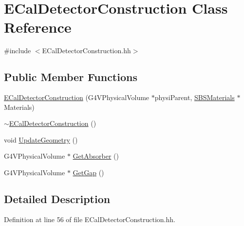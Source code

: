 \hypertarget{class_e_cal_detector_construction}{\section{E\-Cal\-Detector\-Construction Class Reference}
\label{class_e_cal_detector_construction}
}


{\ttfamily \#include $<$E\-Cal\-Detector\-Construction.\-hh$>$}

\subsection*{Public Member Functions}
\begin{DoxyCompactItemize}
\item 
\hyperlink{class_e_cal_detector_construction_ad7b4dc31e1138aa6f3ee99b7b5bc60af}{E\-Cal\-Detector\-Construction} (G4\-V\-Physical\-Volume $\ast$physi\-Parent, \hyperlink{class_s_b_s_materials}{S\-B\-S\-Materials} $\ast$Materials)
\item 
\hyperlink{class_e_cal_detector_construction_a28e034fc3c3961369812c3e363719072}{$\sim$\-E\-Cal\-Detector\-Construction} ()
\item 
void \hyperlink{class_e_cal_detector_construction_aa1f9eb7928fee8e2dd62d488b60fc6f7}{Update\-Geometry} ()
\item 
G4\-V\-Physical\-Volume $\ast$ \hyperlink{class_e_cal_detector_construction_ac50bfcd7b4b64dc1a72cad91b131efb9}{Get\-Absorber} ()
\item 
G4\-V\-Physical\-Volume $\ast$ \hyperlink{class_e_cal_detector_construction_a97440bb92db785649209d6e3fbd84dd9}{Get\-Gap} ()
\end{DoxyCompactItemize}


\subsection{Detailed Description}


Definition at line 56 of file E\-Cal\-Detector\-Construction.\-hh.



